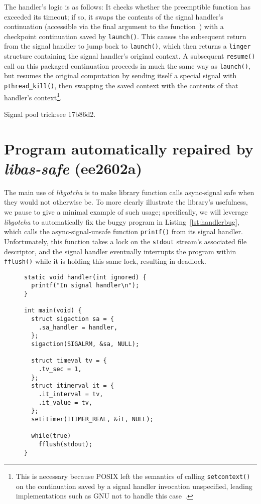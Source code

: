 \documentclass[12pt,letterpaper]{book}
\begin{document}
The handler's logic is as follows:  It checks whether
the preemptible function has exceeded its timeout; if so, it swaps the contents
of the signal handler's continuation (accessible via the final argument to the
function~\cite{sigaction-manpage}) with a checkpoint continuation saved by
\texttt{launch()}.  This causes the subsequent return from the signal handler
to jump back to \texttt{launch()}, which then returns a \texttt{linger}
structure containing the signal handler's original context.  A subsequent
\texttt{resume()} call on this packaged continuation proceeds in much the same
way as \texttt{launch()}, but resumes the original computation by sending
itself a special signal with \texttt{pthread\_kill()}, then swapping the saved
context with the contents of that handler's context\footnote{This is necessary
because POSIX left the semantics of calling \texttt{setcontext()} on the
continuation saved by a signal handler invocation unspecified, leading
implementations such as GNU not to handle this
case~\cite{getcontext-manpage}.}.

Signal pool trick:\@ see 17b86d2.


\section{Program automatically repaired by \textit{libas-safe} (ee2602a)}

The main use of \textit{libgotcha} is to make library function calls async-signal safe when
they would not otherwise be.  To more clearly illustrate the library's usefulness, we
pause to give a minimal example of such usage; specifically, we will leverage
\textit{libgotcha} to automatically fix the buggy program in Listing~\ref{lst:handlerbug},
which calls the async-signal-unsafe function \texttt{printf()} from its signal
handler.  Unfortunately, this function takes a lock on the \texttt{stdout} stream's
associated file descriptor, and the signal handler eventually interrupts the program
within \texttt{fflush()} while it is holding this same lock, resulting in deadlock.

\begin{figure}
\begin{lstlisting}[label=lst:handlerbug,caption=C program with a buggy signal handler]
static void handler(int ignored) {
  printf("In signal handler\n");
}

int main(void) {
  struct sigaction sa = {
    .sa_handler = handler,
  };
  sigaction(SIGALRM, &sa, NULL);

  struct timeval tv = {
    .tv_sec = 1,
  };
  struct itimerval it = {
    .it_interval = tv,
    .it_value = tv,
  };
  setitimer(ITIMER_REAL, &it, NULL);

  while(true)
    fflush(stdout);
}
\end{lstlisting}
\end{figure}
\end{document}
